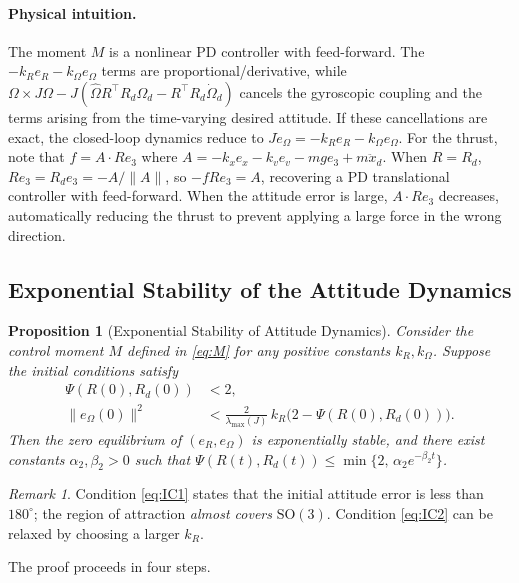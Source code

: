 \documentclass[11pt]{article}
\newtheorem{proposition}{Proposition}
\theoremstyle{remark}
\newtheorem{remark}{Remark}
\newcommand{\SO}{\mathrm{SO}(3)}
\newcommand{\hatmap}[1]{\widehat{#1}}
\newcommand{\lmax}{\lambda_{\max}}
\begin{document}
\paragraph{Physical intuition.} The moment $M$ is a nonlinear PD controller with feed-forward. The $-k_R e_R - k_\Omega e_\Omega$ terms are proportional/derivative, while $\Omega \times J\Omega - J(\hatmap{\Omega}R^\top R_d\Omega_d - R^\top R_d \dot{\Omega}_d)$ cancels the gyroscopic coupling and the terms arising from the time-varying desired attitude. If these cancellations are exact, the closed-loop dynamics reduce to $J\dot e_\Omega = -k_R e_R - k_\Omega e_\Omega$. For the thrust, note that $f = A\cdot Re_3$ where $A = -k_x e_x - k_v e_v - mge_3 + m\ddot x_d$. When $R = R_d$, $Re_3 = R_d e_3 = -A/\|A\|$, so $-fRe_3 = A$, recovering a PD translational controller with feed-forward. When the attitude error is large, $A\cdot Re_3$ decreases, automatically reducing the thrust to prevent applying a large force in the wrong direction.

\subsection{Exponential Stability of the Attitude Dynamics}
\label{sec:prop1}

\begin{proposition}[Exponential Stability of Attitude Dynamics]
\label{prop:1}
Consider the control moment $M$ defined in \eqref{eq:M} for any positive constants $k_R, k_\Omega$. Suppose the initial conditions satisfy
\begin{align}
    \Psi(R(0), R_d(0)) &< 2, \label{eq:IC1}\\
    \|e_\Omega(0)\|^2 &< \tfrac{2}{\lmax(J)}\, k_R\bigl(2 - \Psi(R(0), R_d(0))\bigr). \label{eq:IC2}
\end{align}
Then the zero equilibrium of $(e_R, e_\Omega)$ is exponentially stable, and there exist constants $\alpha_2, \beta_2 > 0$ such that
$\Psi(R(t), R_d(t)) \leq \min\{2,\, \alpha_2 e^{-\beta_2 t}\}$.
\end{proposition}

\begin{remark}
Condition \eqref{eq:IC1} states that the initial attitude error is less than $180^\circ$; the region of attraction \emph{almost covers} $\SO$. Condition \eqref{eq:IC2} can be relaxed by choosing a larger $k_R$.
\end{remark}

The proof proceeds in four steps.
\end{document}
